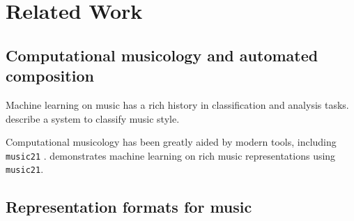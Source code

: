 \documentclass[dissertation.tex]{subfiles}
\begin{document}
\chapter{Related Work}





\section{Computational musicology and automated composition}

Machine learning on music has a rich history in classification and analysis tasks.
\cite{Herlands2014} describe a system to classify music style.

Computational musicology has been greatly aided by modern tools, including
\texttt{music21} \cite{Scott2015}. \cite{Cuthbert2011} demonstrates machine
learning on rich music representations using \texttt{music21}.

\section{Representation formats for music}
\end{document}
